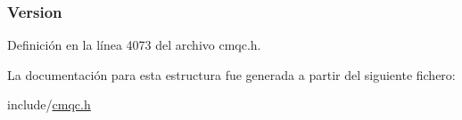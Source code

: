 \subsubsection[{Version}]{ Version}\label{structtag_m_q_c_s_p_a0656ef8f766b3907d394d88a35d7b7e9}


Definición en la línea 4073 del archivo cmqc.\+h.



La documentación para esta estructura fue generada a partir del siguiente fichero\+:\begin{DoxyCompactItemize}
\item 
include/\hyperlink{cmqc_8h}{cmqc.\+h}\end{DoxyCompactItemize}
